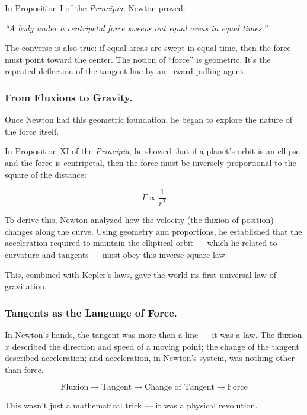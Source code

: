 In Proposition I of the \textit{Principia}, Newton proved:  

\textit{“A body under a centripetal force sweeps out equal areas in equal times.”}

The converse is also true: if equal areas are swept in equal time, then the force must point toward the center. The notion of “force” is geometric. It’s the repeated deflection of the tangent line by an inward-pulling agent.

\subsubsection{From Fluxions to Gravity.} 

Once Newton had this geometric foundation, he began to explore the nature of the force itself.

In Proposition XI of the \textit{Principia}, he showed that if a planet’s orbit is an ellipse and the force is centripetal, then the force must be inversely proportional to the square of the distance:

\[
F \propto \frac{1}{r^2}
\]

To derive this, Newton analyzed how the velocity (the fluxion of position) changes along the curve. Using geometry and proportions, he established that the acceleration required to maintain the elliptical orbit — which he related to curvature and tangents — must obey this inverse-square law.

This, combined with Kepler’s laws, gave the world its first universal law of gravitation.

\subsubsection{Tangents as the Language of Force.} 

In Newton’s hands, the tangent was more than a line — it was a law. The fluxion $\dot{x}$ described the direction and speed of a moving point; the change of the tangent described acceleration; and acceleration, in Newton’s system, was nothing other than force.

\[
\text{Fluxion} \rightarrow \text{Tangent} \rightarrow \text{Change of Tangent} \rightarrow \text{Force}
\]

This wasn’t just a mathematical trick — it was a physical revolution.


